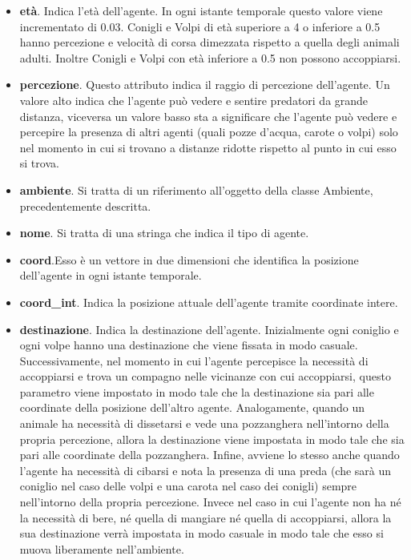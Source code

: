 \documentclass[11pt]{article}
\begin{document}
\begin{itemize}
    \item \textbf{età}. Indica l'età dell'agente. In ogni istante temporale questo valore viene incrementato di 0.03. Conigli e Volpi di età superiore a 4 o inferiore a 0.5 hanno percezione e velocità di corsa dimezzata rispetto a quella degli animali adulti. Inoltre Conigli e Volpi con età inferiore a 0.5 non possono accoppiarsi. 
    \item \textbf{percezione}. Questo attributo indica il raggio di percezione dell'agente. Un valore alto indica che l'agente può vedere e sentire predatori da grande distanza, viceversa un valore basso sta a significare che l'agente può vedere e percepire la presenza di altri agenti (quali pozze d'acqua, carote o volpi) solo nel momento in cui si trovano a distanze ridotte rispetto al punto in cui esso si trova. 
    \item \textbf{ambiente}. Si tratta di un riferimento all'oggetto della classe Ambiente, precedentemente descritta. 
    \item \textbf{nome}. Si tratta di una stringa che indica il tipo di agente. 
    \item \textbf{coord}.Esso è un vettore in due dimensioni che identifica la posizione dell'agente in ogni istante temporale. 
    \item \textbf{coord\_int}. Indica la posizione attuale dell'agente tramite coordinate intere.
    \item \textbf{destinazione}. Indica la destinazione dell'agente. Inizialmente ogni coniglio e ogni volpe hanno una destinazione che viene fissata in modo casuale. Successivamente, nel momento in cui l'agente percepisce la necessità di accoppiarsi e trova un compagno nelle vicinanze con cui accoppiarsi, questo parametro viene impostato in modo tale che la destinazione sia pari alle coordinate della posizione dell'altro agente. Analogamente, quando un animale ha necessità di dissetarsi e vede una pozzanghera nell'intorno della propria percezione, allora la destinazione viene impostata in modo tale che sia pari alle coordinate della pozzanghera. Infine, avviene lo stesso anche quando l'agente ha necessità di cibarsi e nota la presenza di una preda (che sarà un coniglio nel caso delle volpi e una carota nel caso dei conigli) sempre nell'intorno della propria percezione. 
    Invece nel caso in cui l'agente non ha né la necessità di bere, né quella di mangiare né quella di accoppiarsi, allora la sua destinazione verrà impostata in modo casuale in modo tale che esso si muova liberamente nell'ambiente. 

\end{itemize}
\end{document}
